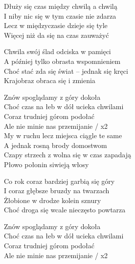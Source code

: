 \begin{text}
Dłuży się czas między chwilą a chwilą\\
I niby nic się w tym czasie nie zdarza\\
Lecz w międzyczasie dzieje się tyle\\
Więcej niż da się na czas zauważyć

Chwila swój ślad odciska w pamięci\\
A później tylko obrasta wspomnieniem\\
Choć stać zda się świat – jednak się kręci\\
Krajobraz obraca się i zmienia

Znów spoglądamy z góry dokoła\\
Choć czas na łeb w dół ucieka chwilami\\
Coraz trudniej górom podołać\\
Ale nie minie nas przemijanie / x2\\

My w ruchu lecz miejsca ciągle te same\\
A jednak rosną brody domostwom\\
Czapy strzech z wolna się w czas zapadają\\
Płowo połonin siwieją włosy

Co rok coraz bardziej garbią się góry\\
I coraz głębsze bruzdy na twarzach\\
Żłobione w drodze kolein sznury\\
Choć droga się wcale nieczęsto powtarza

Znów spoglądamy z góry dokoła\\
Choć czas na łeb w dół ucieka chwilami\\
Coraz trudniej górom podołać\\
Ale nie minie nas przemijanie / x2
\end{text}